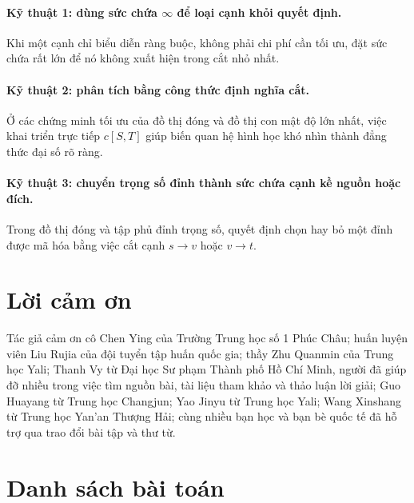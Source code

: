 \documentclass[11pt]{article}
\newcommand{\INF}{\infty}
\begin{document}
\paragraph{Kỹ thuật 1: dùng sức chứa \(\INF\) để loại cạnh khỏi quyết định.}
Khi một cạnh chỉ biểu diễn ràng buộc, không phải chi phí cần tối ưu, đặt sức
chứa rất lớn để nó không xuất hiện trong cắt nhỏ nhất.

\paragraph{Kỹ thuật 2: phân tích bằng công thức định nghĩa cắt.}
Ở các chứng minh tối ưu của đồ thị đóng và đồ thị con mật độ lớn nhất, việc
khai triển trực tiếp \(c[S,T]\) giúp biến quan hệ hình học khó nhìn thành
đẳng thức đại số rõ ràng.

\paragraph{Kỹ thuật 3: chuyển trọng số đỉnh thành sức chứa cạnh kề nguồn hoặc
đích.}
Trong đồ thị đóng và tập phủ đỉnh trọng số, quyết định chọn hay bỏ một đỉnh
được mã hóa bằng việc cắt cạnh \(s\to v\) hoặc \(v\to t\).

\section{Lời cảm ơn}

Tác giả cảm ơn cô Chen Ying của Trường Trung học số 1 Phúc Châu; huấn luyện
viên Liu Rujia của đội tuyển tập huấn quốc gia; thầy Zhu Quanmin của Trung
học Yali; Thanh Vy từ Đại học Sư phạm Thành phố Hồ Chí Minh, người đã giúp
đỡ nhiều trong việc tìm nguồn bài, tài liệu tham khảo và thảo luận lời giải;
Guo Huayang từ Trung học Changjun; Yao Jinyu từ Trung học Yali; Wang Xinshang
từ Trung học Yan'an Thượng Hải; cùng nhiều bạn học và bạn bè quốc tế đã hỗ
trợ qua trao đổi bài tập và thư từ.

\appendix

\section{Danh sách bài toán}
\end{document}
